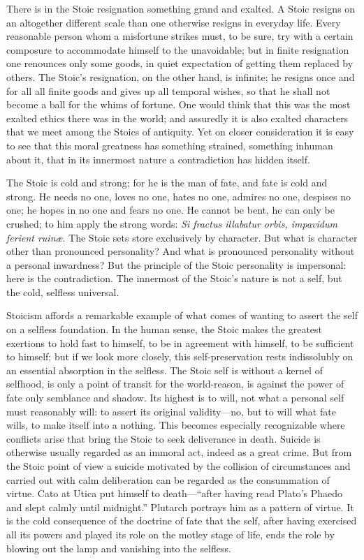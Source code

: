 \documentclass[12pt]{book}
\newcommand{\opage}[1]{\marginnote{\footnotesize\textit{[#1]}}}
\begin{document}
There is in the Stoic resignation something grand and exalted. A Stoic
resigns on an altogether different scale than one otherwise resigns in
everyday life. Every reasonable person whom a misfortune strikes must,
to be sure, try with a certain composure to accommodate himself to the
unavoidable; but in finite resignation one renounces only some goods, in
quiet expectation of getting them replaced by others. The Stoic's
resignation, on the other hand, is infinite; he resigns once and for
all
\opage{211}\setcounter{footnote}{0}%
all finite goods and gives up all temporal wishes, so that he shall not
become a ball for the whims of fortune. One would think that this was
the most exalted ethics there was in the world; and assuredly it is also
exalted characters that we meet among the Stoics of antiquity. Yet on
closer consideration it is easy to see that this moral greatness has
something strained, something inhuman about it, that in its innermost
nature a contradiction has hidden itself.

The Stoic is cold and strong; for he is the man of fate, and fate is
cold and strong. He needs no one, loves no one, hates no one, admires no
one, despises no one; he hopes in no one and fears no one. He cannot be
bent, he can only be crushed; to him apply the strong words:
\textit{Si fractus illabatur orbis, impavidum ferient ruinæ}. The Stoic
sets store exclusively by character.
But what is character other than pronounced personality? And what is
pronounced personality without a personal inwardness? But the principle
of the Stoic personality is impersonal: here is the contradiction. The
innermost of the Stoic's nature is not a self, but the cold, selfless
universal.

Stoicism affords a remarkable example of what comes of wanting to
assert the self on a selfless foundation. In the human sense, the Stoic
makes the greatest exertions to hold fast to himself, to be in agreement
with himself, to be sufficient to himself; but if we look more closely,
this self-preservation rests indissolubly on an essential absorption in
the selfless. The Stoic self is without a kernel of selfhood, is only a
point of transit for the world-reason, is against the power of fate
only semblance and shadow. Its highest is to will, not what a personal
self must reasonably will: to assert its original validity---no, but to
will what fate
\opage{212}\setcounter{footnote}{0}%
wills, to make itself into a nothing. This becomes especially
recognizable where conflicts arise that bring the Stoic to seek
deliverance in death. Suicide is otherwise usually regarded as an
immoral act, indeed as a great crime. But from the Stoic point of view a
suicide motivated by the collision of circumstances and carried out with
calm deliberation can be regarded as the consummation of virtue. Cato at
Utica put himself to death---``after having read Plato's Phaedo and
slept calmly until midnight.'' Plutarch portrays him as a pattern of
virtue. It is the cold consequence of the doctrine of fate that the
self, after having exercised all its powers and played its role on the
motley stage of life, ends the role by blowing out the lamp and
vanishing into the selfless.
\end{document}
